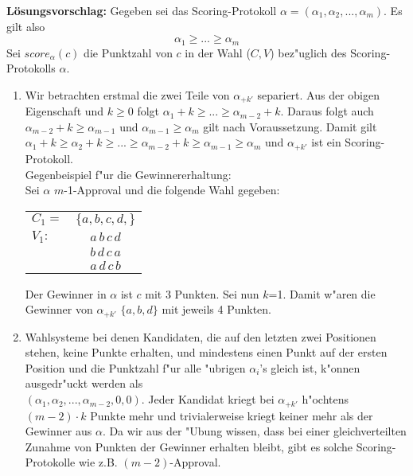 \documentclass[a4paper,12pt,titlepage,oneside]{article}
\newcommand\bc{\begin{center}}
\newcommand\ec{\end{center}}
\begin{document}
\noindent\textbf{L\"osungsvorschlag:}
\newline
Gegeben sei das Scoring-Protokoll $\alpha = (\alpha_1, \alpha_2,...,\alpha_m)$. Es gilt also $$\alpha_1\geq ...\geq \alpha_m$$ Sei $score_{\alpha}(c)$ die Punktzahl von $c$ in der Wahl ($C, V$) bez"uglich des Scoring-Protokolls $\alpha$.\\
\begin{enumerate}
\item Wir betrachten erstmal die zwei Teile von $\alpha_{+k'}$ separiert. Aus der obigen Eigenschaft und $k \geq 0$ folgt $\alpha_1+k\geq ...\geq \alpha_{m-2}+k$. Daraus folgt auch $\alpha_{m-2}+k \geq \alpha_{m-1}$ und $\alpha_{m-1} \geq \alpha_{m}$ gilt nach Voraussetzung. Damit gilt $\alpha_1 + k \geq \alpha_2 + k \geq . . . \geq \alpha_{m-2}+k \geq \alpha_{m-1} \geq \alpha_{m}$ und $\alpha_{+k'}$ ist ein Scoring-Protokoll.\\
Gegenbeispiel f"ur die Gewinnererhaltung:\\
Sei $\alpha$ $m$-1-Approval und die folgende Wahl gegeben:\\
\bc
\begin{tabular}{|lc|}
\hline
$C_1 =$&$ \{a,b,c,d,\}$ 	\\
 $V_1:$ 	& $a\,b\,c\,d$\\
		& $b\,d\,c\,a$\\
		& $a\,d\,c\,b$\\
\hline
\end{tabular}
\ec
Der Gewinner in $\alpha$ ist $c$ mit 3 Punkten. Sei nun $k$=1. Damit w"aren die Gewinner von $\alpha_{+k'}$ $\{a,b,d\}$ mit jeweils 4 Punkten.\\
\item Wahlsysteme bei denen Kandidaten, die auf den letzten zwei Positionen stehen, keine Punkte erhalten, und mindestens einen Punkt auf der ersten Position und die Punktzahl f"ur alle "ubrigen $\alpha_i$'s gleich ist, k"onnen ausgedr"uckt werden als\\$(\alpha_1, \alpha_2, . . . ,\alpha_{m-2},0,0)$. Jeder Kandidat kriegt bei $\alpha_{+k'}$ h"ochtens $(m-2)\cdot k$ Punkte mehr und trivialerweise kriegt keiner mehr als der Gewinner aus $\alpha$. Da wir aus der "Ubung wissen, dass bei einer gleichverteilten Zunahme von Punkten der Gewinner erhalten bleibt, gibt es solche Scoring-Protokolle wie z.B. $(m-2)$-Approval.
\end{enumerate}
\newpage
\end{document}
